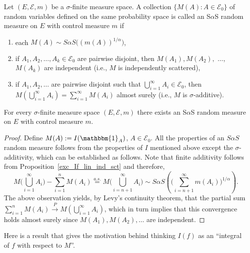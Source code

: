 \documentclass[12pt]{amsart}
\begin{document}
\begin{defn}
Let $(E, \mathcal{E}, m)$ be a $\sigma$-finite measure space. A collection $\{M(A): A \in \mathcal{E}_0\}$ of random variables defined on the same probability space is called an S$\alpha$S random measure on $E$ with control measure $m$ if
\begin{enumerate}
\item each $M(A) \sim S\alpha S\big((m(A))^{1/\alpha}\big)$,
\item if $A_1, A_2, \ldots, A_k \in \mathcal{E}_0$ are pairwise disjoint, then $M(A_1), M(A_2),$ $\ldots$, $M(A_k)$ are independent (i.e., $M$ is independently scattered),
\item if $A_1, A_2, \ldots$ are pairwise disjoint such that $\bigcup_{i=1}^\infty A_i \in \mathcal{E}_0$, then $M(\bigcup_{i=1}^\infty A_i)= \sum_{i=1}^\infty M(A_i)$ almost surely (i.e., $M$ is $\sigma$-additive).
\end{enumerate}

\begin{propn} For every $\sigma$-finite measure space $(E, \mathcal{E}, m)$ there exists an S$\alpha$S random measure on $E$ with control measure $m$.
\end{propn}

\begin{proof} Define $M(A):=I(\mathbbm{1}_A)$, $A \in \mathcal{E}_0$. All the properties of an $S\alpha S$ random measure follows from the properties of $I$ mentioned above except the $\sigma$-additivity, which can be established as follows. Note that finite additivity follows from Proposition~\ref{exc_If_lin_ind_sct} and therefore,
\[
M\Big(\bigcup_{i=1}^\infty A_i\Big) - \sum_{i=1}^n M(A_i) {\stackrel{a.s.}{=}} M\Big(\bigcup_{i=n+1}^\infty A_i\Big) \sim S\alpha S \left(\Big(\sum_{i=n+1}^\infty m(A_i)\Big)^{1/\alpha}\right).
\]
The above observation yields, by Levy's continuity theorem, that the partial sum $\sum_{i=1}^n M(A_i) {\stackrel{P}{\longrightarrow}} M(\bigcup_{i=1}^\infty A_i)$, which in turn implies that this convergence holds almost surely since $M(A_1), M(A_2), \ldots$ are independent.
\end{proof}

\end{defn}

\normalsize

Here is a result that gives the motivation behind thinking $I(f)$ as an ``integral of $f$ with respect to $M$''.
\end{document}
